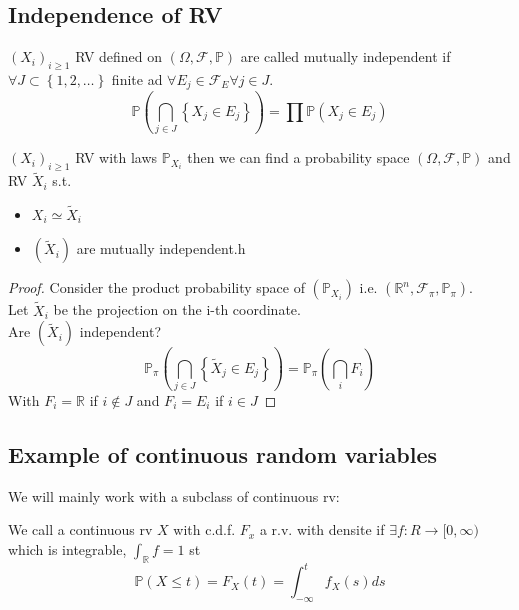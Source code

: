 \documentclass[../main.tex]{subfiles}
\begin{document}
\subsection{Independence of RV}
\begin{defn}[Independence of RV]
	$ ( X_i)_{i \geq 1} $ RV defined on $ (\Omega, \mathcal{F}, \mathbb{P}) $ are called mutually independent if $\forall J \subset \left\{ 1,2, \ldots \right\} $ finite ad $\forall E_j \in \mathcal{F}_E\forall j \in J$.\\
	\[ 
	\mathbb{P}(  \bigcap_{j\in J} \left\{ X_j\in E_j \right\} ) = \prod \mathbb{P}( X_j\in E_j) 
	\]	
\end{defn}
\begin{propo}
$( X_i)_{i \geq 1} $ RV with laws $ \mathbb{P}_{X_i} $ then we can find a probability space $ ( \Omega, \mathcal{F}, \mathbb{P}) $ and RV $ \tilde X_i$ s.t.
\begin{itemize}
\item $X_i \simeq \tilde X_i$ 
\item $( \tilde X_i) $ are mutually independent.h
\end{itemize}

\end{propo}
\begin{proof}
Consider the product probability space of $ ( \mathbb{P}_{X_i} ) $ i.e. $ ( \mathbb{R}^n, \mathcal{F}_\pi, \mathbb{P}_\pi) $.\\
Let $\tilde X_i$ be the projection on the i-th coordinate.\\
Are $ ( \tilde X_i) $ independent?\\
\[ 
\mathbb{P}_\pi ( \bigcap_{j\in J} \left\{ \tilde X_j \in E_j \right\} ) = \mathbb{P}_\pi ( \bigcap_i F_i) 
\]
With $F_i= \mathbb{R}$ if $i\not\in J$  and $F_i=E_i $ if $i\in J$ 

\end{proof}
\subsection{Example of continuous random variables}
We will mainly work with a subclass of continuous rv:
\begin{defn}
	We call a continuous rv $X$ with c.d.f. $F_x$ a r.v. with densite if $\exists f: R \to [ 0, \infty ) $ which is integrable, $ \int_\mathbb{R} f=1$ st
	\[ 
	\mathbb{P}( X \leq t) = F_X( t) = \int_{ - \infty  }^{ t }f_X( s) ds
	\]
		
\end{defn}




	
\end{document}
